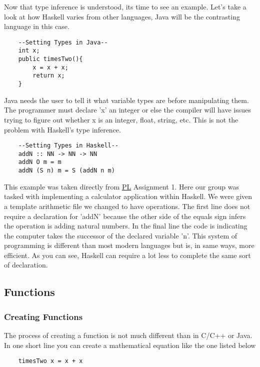 \documentclass{article}
\begin{document}
    \medskip\noindent Now that type inference is understood, its time to see an example. Let's take a look at how Haskell varies from other languages, Java will be the contrasting language in this case.
    \begin{lstlisting}
    --Setting Types in Java--
    int x;
    public timesTwo(){
        x = x + x;
        return x;
    }
    \end{lstlisting}
    
    \medskip
    Java needs the user to tell it what variable types are before manipulating them. The programmer must declare 'x' an integer or else the compiler will have issues trying to figure out whether x is an integer, float, string, etc. This is not the problem with Haskell's type inference.
    
    \begin{lstlisting}
    --Setting Types in Haskell--
    addN :: NN -> NN -> NN
    addN O m = m
    addN (S n) m = S (addN n m)
    \end{lstlisting}
    
    \noindent This example was taken directly from \href{PL}{PL} Assignment 1. Here our group was tasked with implementing a calculator application within Haskell. We were given a template arithmetic file we changed to have operations. The first line does not require a declaration for 'addN' because the other side of the equals sign infers the operation is adding natural numbers. In the final line the code is indicating the computer takes the successor of the declared variable 'n'. This system of programming is different than most modern languages but is, in same ways, more efficient. As you can see, Haskell can require a lot less to complete the same sort of declaration.
    
\subsection{Functions}
    
    \subsubsection{Creating Functions}
    The process of creating a function is not much different than in C/C++ or Java. In one short line you can create a mathematical equation like the one listed below
    
    \begin{lstlisting}
    timesTwo x = x + x 
    \end{lstlisting}
    
\end{document}
